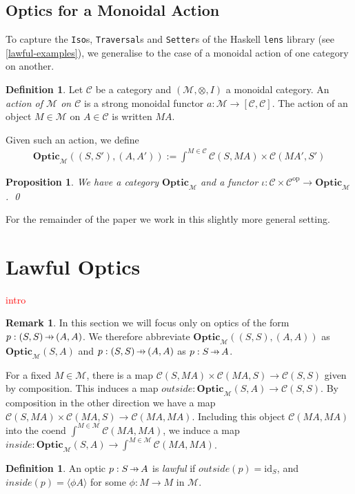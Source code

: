 \documentclass[11pt,a4paper]{article}
\theoremstyle{plain}
\newtheorem{proposition}[theorem]{Proposition}
\theoremstyle{definition}
\newtheorem{definition}[theorem]{Definition}
\newtheorem{remark}[theorem]{Remark}
\newcommand{\C}{\mathscr{C}}
\newcommand{\M}{\mathscr{M}}
\newcommand{\Optic}{\mathbf{Optic}}
\newcommand{\id}{\mathrm{id}}
\newcommand{\op}{\mathrm{op}}
\newcommand{\hto}{\ensuremath{\,\mathaccent\shortmid\rightarrow\,}}
\newcommand{\todo}[1]{\textcolor{red}{\small #1}}
\begin{document}
\subsection{Optics for a Monoidal Action}

To capture the \texttt{Iso}s, \texttt{Traversal}s and \texttt{Setter}s of the Haskell \texttt{lens} library (see \ref{lawful-examples}), we generalise to the case of a monoidal action of one category on another.

\begin{definition}
Let $\C$ be a category and $(\M, \otimes, I)$ a monoidal category. An \emph{action of $\M$ on $\C$} is a strong monoidal functor $a : \M \to [\C, \C]$. The action of an object $M \in \M$ on $A \in \C$ is written $MA$.
\end{definition}

Given such an action, we define 
\begin{align*}
\Optic_\M((S, S'), (A, A')) := \int^{M \in \C} \C(S, MA) \times \C(MA', S')
\end{align*}

\begin{proposition}
We have a category $\Optic_\M$ and a functor $\iota : \C \times \C^\op \to \Optic_\M$. \qed
\end{proposition}

For the remainder of the paper we work in this slightly more general setting.

\section{Lawful Optics}
\todo{intro}

\begin{remark}
In this section we will focus only on optics of the form $p : (S,S) \hto (A, A)$. We therefore abbreviate $\Optic_\M((S, S), (A, A))$ as $\Optic_\M(S, A)$ and $p : (S, S) \hto (A, A)$ as $p : S \hto A$.
\end{remark}

For a fixed $M \in \M$, there is a map $\C(S, M A) \times \C(M A, S) \to \C(S, S)$ given by composition. This induces a map $outside : \Optic_\M(S, A) \to \C(S, S)$. By composition in the other direction we have a map $\C(S, M A) \times \C(M A, S) \to \C(M A, M A)$. Including this object $\C(M A, M A)$ into the coend $\int^{M \in \M} \C(M A, M A)$, we induce a map $inside : \Optic_\M(S, A) \to \int^{M \in \M} \C(M A, M A)$. 
\begin{definition}
An optic $p : S \hto A$ is \emph{lawful} if $outside(p) = \id_S$, and $inside(p) = \langle \phi A \rangle$ for some $\phi : M \to M$ in $\M$.
\end{definition}
\end{document}
